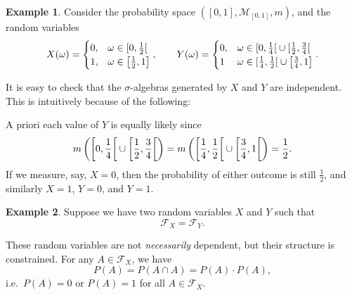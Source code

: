 \documentclass[a4paper]{scrartcl}
\theoremstyle{definition}
\newtheorem{example}{Example}[section]
\theoremstyle{plain}
\theoremstyle{remark}
\begin{document}
\begin{example}
  \label{eg:independentstepfunctions}
  Consider the probability space $\left( [0, 1], \mathcal{M}_{[0, 1]}, m \right)$, and the random variables
  \begin{equation*}
    X(\omega) =
    \begin{cases}
      0, &\omega \in \interval[open right]{0}{\frac{1}{2}} \\
      1, &\omega \in \left[ \frac{1}{2}, 1 \right]
    \end{cases},
    \qquad
    Y(\omega) =
    \begin{cases}
      0, & \omega \in \interval[open right]{0}{\frac{1}{4}} \cup \interval[open right]{\frac{1}{2}}{\frac{3}{4}} \\
      1 & \omega \in \interval[open right]{\frac{1}{4}}{\frac{1}{2}} \cup \left[ \frac{3}{4}, 1 \right]
    \end{cases}.
  \end{equation*}

  It is easy to check that the $\sigma$-algebras generated by $X$ and $Y$ are independent. This is intuitively because of the following:

  A priori each value of $Y$ is equally likely since
  \begin{equation*}
    m\left( \interval[open right, scaled]{0}{\frac{1}{4}} \cup \interval[open right, scaled]{\frac{1}{2}}{\frac{3}{4}} \right) = m\left( \interval[open right, scaled]{\frac{1}{4}}{\frac{1}{2}} \cup \interval[open right, scaled]{\frac{3}{4}}{1} \right) = \frac{1}{2}.
  \end{equation*}
  If we measure, say, $X = 0$, then the probability of either outcome is still $\frac{1}{2}$, and similarly $X = 1$, $Y = 0$, and $Y = 1$.
\end{example}

\begin{example}
  Suppose we have two random variables $X$ and $Y$ such that
  \begin{equation*}
    \mathcal{F}_{X} = \mathcal{F}_{Y}.
  \end{equation*}

  These random variables are not \emph{necessarily} dependent, but their structure is constrained. For any $A \in \mathcal{F}_{X}$, we have
  \begin{equation*}
    P(A) = P(A \cap A) = P(A)\cdot P(A),
  \end{equation*}
  i.e.\ $P(A) = 0$ or $P(A) = 1$ for all $A \in \mathcal{F}_{X}$.
\end{example}
\end{document}

